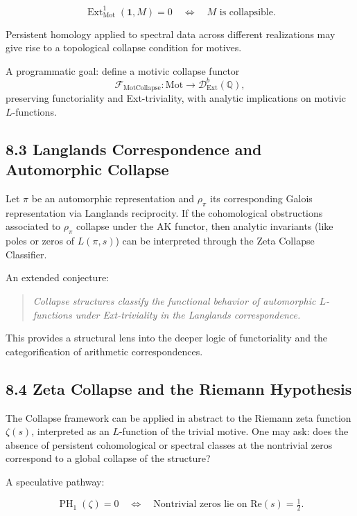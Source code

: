 \documentclass[11pt]{article}
\DeclareMathOperator{\Ext}{Ext}
\DeclareMathOperator{\PH}{PH}
\begin{document}
\[
\Ext^1_{\mathrm{Mot}}(\mathbf{1}, M) = 0 \quad \Leftrightarrow \quad M \text{ is collapsible.}
\]

Persistent homology applied to spectral data across different realizations may give rise to a topological collapse condition for motives.

A programmatic goal: define a motivic collapse functor
\[
\mathcal{F}_{\mathrm{MotCollapse}} : \mathrm{Mot} \to \mathcal{D}^{b}_{\mathrm{Ext}}(\mathbb{Q}),
\]
preserving functoriality and Ext-triviality, with analytic implications on motivic $L$-functions.

\subsection{8.3 Langlands Correspondence and Automorphic Collapse}

Let $\pi$ be an automorphic representation and $\rho_\pi$ its corresponding Galois representation via Langlands reciprocity.  
If the cohomological obstructions associated to $\rho_\pi$ collapse under the AK functor, then analytic invariants (like poles or zeros of $L(\pi,s)$) can be interpreted through the Zeta Collapse Classifier.

An extended conjecture:

\begin{quote}
\emph{Collapse structures classify the functional behavior of automorphic $L$-functions under Ext-triviality in the Langlands correspondence.}
\end{quote}

This provides a structural lens into the deeper logic of functoriality and the categorification of arithmetic correspondences.

\subsection{8.4 Zeta Collapse and the Riemann Hypothesis}

The Collapse framework can be applied in abstract to the Riemann zeta function $\zeta(s)$, interpreted as an $L$-function of the trivial motive.  
One may ask: does the absence of persistent cohomological or spectral classes at the nontrivial zeros correspond to a global collapse of the structure?

A speculative pathway:

\[
\PH_1(\zeta) = 0 \quad \Leftrightarrow \quad \text{Nontrivial zeros lie on } \mathrm{Re}(s) = \tfrac{1}{2}.
\]
\end{document}
